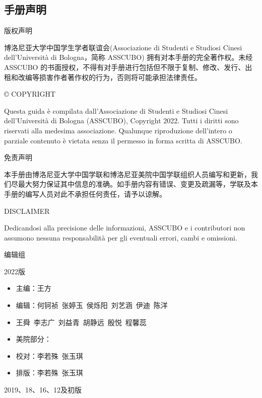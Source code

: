 \begin{titlepage}
\newpage

\topmargin=-2cm                        %

\chapter*{手册声明}                 %
\pagestyle{empty}%
\thispagestyle{empty} 

\vspace{0.5cm}\centerline{\Large 版权声明}
\vspace{0.5cm}博洛尼亚大学中国学生学者联谊会(Associazione di Studenti e Studiosi Cinesi dell'Università di Bologna，简称 ASSCUBO) 拥有对本手册的完全著作权。未经ASSCUBO 的书面授权，不得有对手册进行包括但不限于复制、修改、发行、出租和改编等损害作者著作权的行为，否则将可能承担法律责任。 

\vspace{0.5cm}\centerline{\Large© COPYRIGHT}
\vspace{0.5cm}Questa guida è compilata dall'Associazione di Studenti e Studiosi Cinesi dell’Università di Bologna (ASSCUBO), Copyright 2022. Tutti i diritti sono riservati alla medesima associazione. Qualunque riproduzione dell'intero o parziale contenuto è vietata senza il permesso in forma scritta di ASSCUBO. 

\vspace{0.5cm}\centerline{\Large 免责声明}
\vspace{0.5cm}本手册由博洛尼亚大学中国学联和博洛尼亚美院中国学联组织人员编写和更新，我们尽最大努力保证其中信息的准确。如手册内容有错误、变更及疏漏等，学联及本手册的编写人员对此不承担任何责任，请予以谅解。

\vspace{0.5cm}\centerline{\Large DISCLAIMER}
\vspace{0.5cm}Dedicandosi alla precisione delle informazioni, ASSCUBO e i contributori non assumono nessuna responsabilità per gli eventuali errori, cambi e omissioni. 

\newpage

\topmargin=0cm 
\vspace{1cm}\centerline{\Large 编辑组} 
\vspace{1cm}\centerline{2022版} 
\begin{itemize}

\item[] 主\qquad 编：王\quad 方
\item[] 编\qquad 辑：何钶祯\, 张婷玉\, 侯烁阳\, 刘艺涵\, 伊\quad 迪\, 陈\quad 洋
\item[] \hspace*{2.1cm}王\quad 舜\, 李志广\, 刘益青\, 胡静远\, 殷\quad 悦\, 程馨蕊
\item[] 美院部分：
\item[] 校\qquad 对：李若殊\, 张玉琪
\item[] 排\qquad 版：李若殊\, 张玉琪
\end{itemize}
\vspace{2cm}\centerline{2019、18、16、12及初版} 
\begin{itemize}


\end{itemize}
\end{titlepage}
